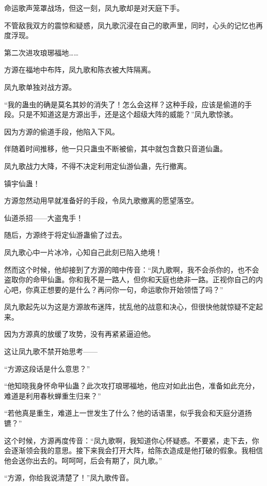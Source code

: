
\begin{this_body}

命运歌声笼罩战场，但这一刻，凤九歌却是对天庭下手。

不管敌我双方的震惊和疑惑，凤九歌沉浸在自己的歌声里，同时，心头的记忆也再度浮现。

第二次进攻琅琊福地……

方源在福地中布阵，凤九歌和陈衣被大阵隔离。

凤九歌单独对战方源。

“我的蛊虫的确是莫名其妙的消失了！怎么会这样？这种手段，应该是偷道的手段。只是不知道这是方源出手，还是这个超级大阵的威能？”凤九歌惊骇。

因为方源的偷道手段，他陷入下风。

伴随着时间推移，他一只只蛊虫不断被偷，其中就包含数只音道仙蛊。

凤九歌战力大降，不得不决定利用定仙游仙蛊，先行撤离。

镇宇仙蛊！

方源忽然动用早就准备好的手段，令凤九歌撤离的愿望落空。

仙道杀招——大盗鬼手！

随后，方源终于将定仙游蛊偷了过去。

凤九歌心中一片冰冷，心知自己此刻已陷入绝境！

然而这个时候，他却接到了方源的暗中传音：“凤九歌啊，我不会杀你的，也不会盗取你的命甲仙蛊。你和我不是一路人，但你和天庭也绝非一路。正视你自己的内心吧，你真正想要的是什么？再问你一句，命运歌你开始领悟了吗？”

凤九歌起先以为这是方源故布迷阵，扰乱他的战意和决心，但很快他就惊疑不定起来。

因为方源真的放缓了攻势，没有再紧紧逼迫他。

这让凤九歌不禁开始思考——

“方源这段话是什么意思？”

“他知晓我身怀命甲仙蛊？此次攻打琅琊福地，他应对如此出色，准备如此充分，难道是利用春秋蝉重生归来？”

“若他真是重生，难道上一世发生了什么？他的话语里，似乎我会和天庭分道扬镳？”

这个时候，方源再度传音：“凤九歌啊，我知道你心怀疑惑。不要紧，走下去，你会逐渐领会我的意思。接下来我会打开大阵，给陈衣造成是他打破的假象。我相信他会送你出去的。呵呵呵，后会有期了，凤九歌。”

“方源，你给我说清楚了！”凤九歌传音。


\end{this_body}
